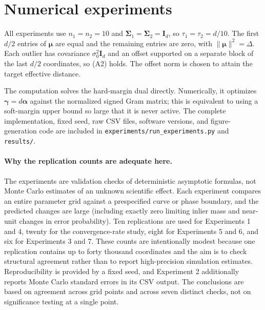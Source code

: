 \section{Numerical experiments}\label{sec:simulations}
All experiments use $n_1=n_2=10$ and $\boldsymbol\Sigma_1=\boldsymbol\Sigma_2=\boldsymbol I_d$, so $\tau_1=\tau_2=d/10$. The first $d/2$ entries of $\boldsymbol\mu$ are equal and the remaining entries are zero, with $\lVert\boldsymbol\mu\rVert^2=\Delta$. Each outlier has covariance $\sigma_0^2\boldsymbol I_d$ and an offset supported on a separate block of the last $d/2$ coordinates, so (A2) holds. The offset norm is chosen to attain the target effective distance.

The computation solves the hard-margin dual directly. Numerically, it optimizes $\boldsymbol\gamma=d\boldsymbol\alpha$ against the normalized signed Gram matrix; this is equivalent to using a soft-margin upper bound so large that it is never active. The complete implementation, fixed seed, raw CSV files, software versions, and figure-generation code are included in \texttt{experiments/run\_experiments.py} and \texttt{results/}.

\paragraph{Why the replication counts are adequate here.}
The experiments are validation checks of deterministic asymptotic formulas, not Monte Carlo estimates of an unknown scientific effect. Each experiment compares an entire parameter grid against a prespecified curve or phase boundary, and the predicted changes are large (including exactly zero limiting inlier mass and near-unit changes in error probability). Ten replications are used for Experiments 1 and 4, twenty for the convergence-rate study, eight for Experiments 5 and 6, and six for Experiments 3 and 7. These counts are intentionally modest because one replication contains up to forty thousand coordinates and the aim is to check structural agreement rather than to report high-precision simulation estimates. Reproducibility is provided by a fixed seed, and Experiment 2 additionally reports Monte Carlo standard errors in its CSV output. The conclusions are based on agreement across grid points and across seven distinct checks, not on significance testing at a single point.

